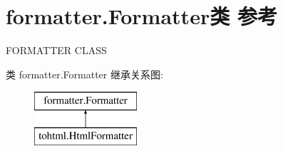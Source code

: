 \hypertarget{classformatter_1_1_formatter}{}\section{formatter.\+Formatter类 参考}
\label{classformatter_1_1_formatter}


F\+O\+R\+M\+A\+T\+T\+ER C\+L\+A\+SS  


类 formatter.\+Formatter 继承关系图\+:\begin{figure}[H]
\begin{center}
\leavevmode
\includegraphics[height=2.000000cm]{classformatter_1_1_formatter}
\end{center}
\end{figure}
